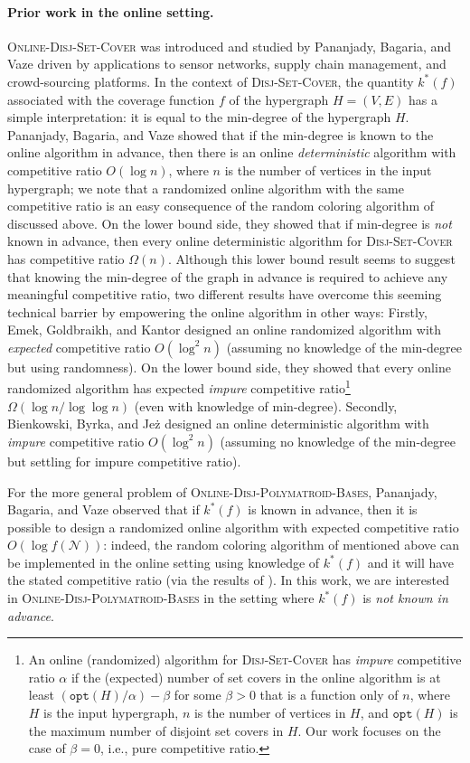 \documentclass[11pt]{article}
\theoremstyle{definition}
\newcommand{\calN}{{\mathcal{N}}}
\newcommand{\ODPB}{\textsc{Online-Disj-Polymatroid-Bases}\xspace}
\newcommand{\DSC}{\textsc{Disj-Set-Cover}\xspace}
\newcommand{\ODSC}{\textsc{Online-Disj-Set-Cover}\xspace}
\newcommand{\opt}{\texttt{opt}}
\begin{document}
\paragraph{Prior work in the online setting.}
\ODSC was introduced and studied by Pananjady, Bagaria, and Vaze \cite{PBV15} driven by applications to sensor networks, supply chain management, and crowd-sourcing platforms. 
In the context of \DSC, the quantity $k^*(f)$ associated with the coverage function $f$ of the hypergraph $H=(V, E)$ has a simple interpretation: it is equal to the min-degree of the hypergraph $H$. Pananjady, Bagaria, and Vaze showed that if the min-degree is known to the online algorithm in advance, then there is an online \emph{deterministic} algorithm with 
competitive ratio $O(\log{n})$, where $n$ is the number of vertices in the input hypergraph; we note that a randomized online algorithm with the same competitive ratio is an easy consequence of the random coloring algorithm of \cite{CCV09} discussed above. 
On the lower bound side, they showed that if min-degree is \emph{not} known in advance, then every online deterministic algorithm for \DSC has competitive ratio $\Omega(n)$. Although this lower bound result seems to suggest that knowing the min-degree of the graph in advance is required to achieve any meaningful competitive ratio, two different results have overcome this seeming technical barrier by empowering the online algorithm in other ways: 
Firstly, Emek, Goldbraikh, and Kantor \cite{EGK19} designed an online randomized algorithm with \emph{expected} competitive ratio $O(\log^2{n})$ (assuming no knowledge of the min-degree but using randomness). On the lower bound side, they showed that every online randomized algorithm has expected \emph{impure} competitive ratio\footnote{An online (randomized) algorithm for \DSC has \emph{impure} competitive ratio $\alpha$ if the (expected) number of set covers in the online algorithm is at least $(\opt(H)/\alpha)-\beta$ for some $\beta>0$ that is a function only of $n$, where $H$ is the input hypergraph, $n$ is the number of vertices in $H$, and $\opt(H)$ is the maximum number of disjoint set covers in $H$. Our work focuses on the case of $\beta=0$, i.e., pure competitive ratio.} $\Omega(\log{n}/\log{\log{n}})$ (even with knowledge of min-degree). 
Secondly, Bienkowski, Byrka, and Je\.{z} \cite{BBJ24} designed an online deterministic algorithm with \emph{impure} competitive ratio $O(\log^2{n})$ (assuming no knowledge of the min-degree but settling for impure competitive ratio). 

For the more general problem of \ODPB, Pananjady, Bagaria, and Vaze \cite{PBV15} observed that if $k^*(f)$ is known in advance, then it is possible to design a randomized online algorithm with expected competitive ratio $O(\log{f(\calN)})$: indeed, the random coloring algorithm of \cite{CCV09} mentioned above can be implemented in the online setting using knowledge of $k^*(f)$ and it will have the stated competitive ratio (via the results of \cite{CCV09}). In this work, we are interested in \ODPB in the setting where $k^*(f)$ is \emph{not known in advance}. 
\end{document}

